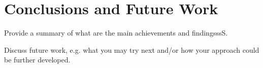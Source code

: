 \section{Conclusions and Future Work}
\label{sec:conclusion}

Provide a summary of what are the main achievements and findingsssS. 

Discuss future work, e.g. what you may try next and/or how your approach could be further developed.